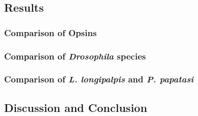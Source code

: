 \subsection{Results}

\subsubsection{Comparison of Opsins}

\subsubsection{Comparison of \emph{Drosophila} species}

\subsubsection{Comparison of \emph{L. longipalpis} and \emph{P. papatasi}}

\subsection{Discussion and Conclusion}